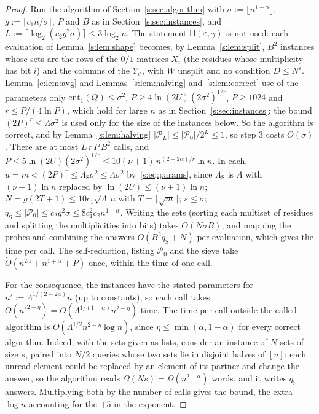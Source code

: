 \documentclass[11pt]{article}
\theoremstyle{definition}
\theoremstyle{remark}
\newcommand{\cnt}{\mathrm{cnt}}
\newcommand{\Pq}{\mathcal{P}}
\newcommand{\Hyp}{\mathsf{H}}
\begin{document}
\begin{proof}
Run the algorithm of Section~\ref{s:sec:algorithm} with $\sigma:=\lfloor n^{1-\alpha}\rfloor$, $g:=\lceil c_1n/\sigma\rceil$, $P$ and $B$ as in Section~\ref{s:sec:instances}, and $L:=\lceil\log_2(c_2g^2\sigma)\rceil\le3\log_2n$. The statement $\Hyp(\varepsilon,\gamma)$ is not used: each evaluation of Lemma~\ref{s:lem:shape} becomes, by Lemma~\ref{s:lem:split}, $B^2$ instances whose sets are the rows of the $0/1$ matrices $X_i$ (the residues whose multiplicity has bit $i$) and the columns of the $Y_{i'}$, with $W$ unsplit and no condition $D\le N^\varepsilon$. Lemma~\ref{c:lem:avg} and Lemmas~\ref{s:lem:halving} and~\ref{s:lem:correct} use of the parameters only $\cnt_1(Q)\le\sigma^2$, $P\ge4\ln(2U)(2\sigma^2)^{1/r}$, $P\ge1024$ and $r\le P/(4\ln P)$, which hold for large $n$ as in Section~\ref{s:sec:instances}; the bound $(2P)^r\le\Lambda\sigma^2$ is used only for the size of the instances below. So the algorithm is correct, and by Lemma~\ref{s:lem:halving} $|\Pq_L|\le|\Pq_0|/2^L\le1$, so step 3 costs $O(\sigma)$. There are at most $L\,r\,P\,B^2$ calls, and $P\le5\ln(2U)(2\sigma^2)^{1/r}\le10(\nu+1)\,n^{(2-2\alpha)/r}\ln n$. In each, $u=m<(2P)^r\le\Lambda_{\mathrm S}\sigma^2\le\Lambda\sigma^2$ by~\eqref{s:eq:params}, since $\Lambda_{\mathrm S}$ is $\Lambda$ with $(\nu+1)\ln n$ replaced by $\ln(2U)\le(\nu+1)\ln n$; $N=g(2T+1)\le10c_1\sqrt\Lambda\,n$ with $T=\lceil\sqrt m\rceil$; $s\le\sigma$; $q_{\mathrm S}\le|\Pq_0|\le c_2g^2\sigma\le8c_1^2c_2n^{1+\alpha}$. Writing the sets (sorting each multiset of residues and splitting the multiplicities into bits) takes $O(N\sigma B)$, and mapping the probes and combining the answers $O(B^2q_{\mathrm S}+N)$ per evaluation, which gives the time per call. The self-reduction, listing $\Pq_0$ and the sieve take $\tilde O(n^{2\alpha}+n^{1+\alpha}+P)$ once, within the time of one call.

For the consequence, the instances have the stated parameters for $n':=\Lambda^{1/(2-2\alpha)}n$ (up to constants), so each call takes $O(n'^{2-\eta})=O(\Lambda^{1/(1-\alpha)}n^{2-\eta})$ time. The time per call outside the called algorithm is $O(\Lambda^{1/2}n^{2-\eta}\log n)$, since $\eta\le\min(\alpha,1-\alpha)$ for every correct algorithm. Indeed, with the sets given as lists, consider an instance of $N$ sets of size $s$, paired into $N/2$ queries whose two sets lie in disjoint halves of $[u]$: each unread element could be replaced by an element of its partner and change the answer, so the algorithm reads $\Omega(Ns)=\Omega(n^{2-\alpha})$ words, and it writes $q_{\mathrm S}$ answers. Multiplying both by the number of calls gives the bound, the extra $\log n$ accounting for the $+5$ in the exponent.
\end{proof}
\end{document}
